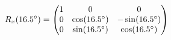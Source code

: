 \documentclass[preview]{standalone}
\begin{document}
\begin{align*}
\special{dvisvgm:raw <g id='unique000'>}R_x(16.5^\circ) = \begin{pmatrix} 1 & 0 & 0 \\ 0 & \cos(16.5^\circ) & -\sin(16.5^\circ) \\ 0 & \sin(16.5^\circ) & \cos(16.5^\circ) \end{pmatrix}\special{dvisvgm:raw </g>}
\end{align*}
\end{document}
